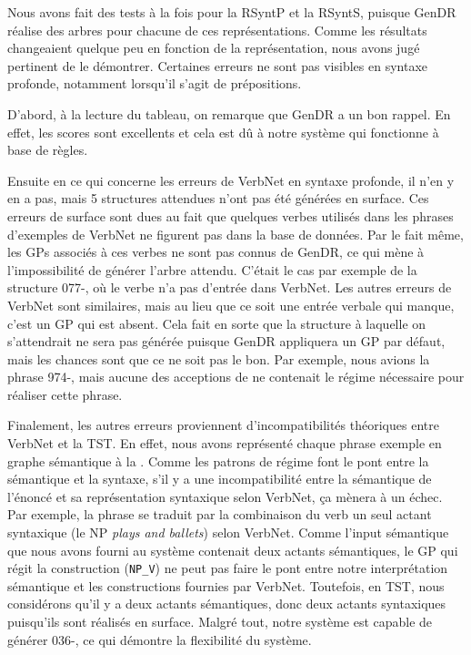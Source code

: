 Nous avons fait des tests à la fois pour la RSyntP et la RSyntS, puisque GenDR réalise des arbres pour chacune de ces représentations. Comme les résultats changeaient quelque peu en fonction de la représentation, nous avons jugé pertinent de le démontrer. Certaines erreurs ne sont pas visibles en syntaxe profonde, notamment lorsqu'il s'agit de prépositions. 

D'abord, à la lecture du tableau, on remarque que GenDR a un bon rappel. En effet, les scores sont excellents et cela est dû à notre système qui fonctionne à base de règles. 

Ensuite en ce qui concerne les erreurs de VerbNet en syntaxe profonde, il n'en y en a pas, mais 5 structures attendues n'ont pas été générées en surface. Ces erreurs de surface sont dues au fait que quelques verbes utilisés dans les phrases d'exemples de VerbNet ne figurent pas dans la base de données. Par le fait même, les \acp{GP} associés à ces verbes ne sont pas connus de GenDR, ce qui mène à l'impossibilité de générer l'arbre attendu. C'était le cas par exemple de la structure 077-, où le verbe  n'a pas d'entrée dans VerbNet. Les autres erreurs de VerbNet sont similaires, mais au lieu que ce soit une entrée verbale qui manque, c'est un \ac{GP} qui est absent. Cela fait en sorte que la structure à laquelle on s'attendrait ne sera pas générée puisque GenDR appliquera un \ac{GP} par défaut, mais les chances sont que ce ne soit pas le bon. Par exemple, nous avions la phrase 974-, mais aucune des acceptions de  ne contenait le régime nécessaire pour réaliser cette phrase.

Finalement, les autres erreurs proviennent d'incompatibilités théoriques entre VerbNet et la \ac{TST}. En effet, nous avons représenté chaque phrase exemple en graphe sémantique à la \cite{mel2012semantics}. Comme les patrons de régime font le pont entre la sémantique et la syntaxe, s'il y a une incompatibilité entre la sémantique de l'énoncé et sa représentation syntaxique selon VerbNet, ça mènera à un échec. Par exemple, la phrase  se traduit par la combinaison du verb  un seul actant syntaxique (le NP \emph{plays and ballets}) selon VerbNet. Comme l'input sémantique que nous avons fourni au système contenait deux actants sémantiques, le \ac{GP} qui régit la construction (\texttt{NP\_V}) ne peut pas faire le pont entre notre interprétation sémantique et les constructions fournies par VerbNet. Toutefois, en \ac{TST}, nous considérons qu'il y a deux actants sémantiques, donc deux actants syntaxiques puisqu'ils sont réalisés en surface. Malgré tout, notre système est capable de générer 036-, ce qui démontre la flexibilité du système.

